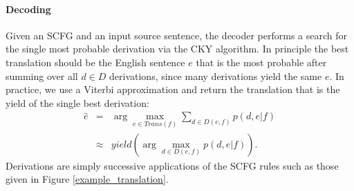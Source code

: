 \documentclass[11pt]{article}
\begin{document}
\paragraph{Decoding}

Given an SCFG and an input source sentence, the decoder performs a
search for the single most probable derivation via the CKY algorithm.
In principle the best translation should be the English sentence $e$
that is the most probable after summing over all $d\in D$ derivations,
since many derivations yield the same $e$.  In practice, we use a
Viterbi approximation and return the translation that is the yield of
the single best derivation:
\begin{eqnarray}
  \label{decoding_eq}
  \hat{e} &=& \arg \max_{e\in Trans(f)} \sum_{d\in D(e,f)}{p(d,e|f)}
  \nonumber \\
             &\approx& \mathit{yield}(\arg \max_{d\in D(e,f)}{p(d,e|f)}).
\end{eqnarray}
Derivations are simply successive applications of the SCFG rules such
as those given in Figure \ref{example_translation}.
\end{document}
